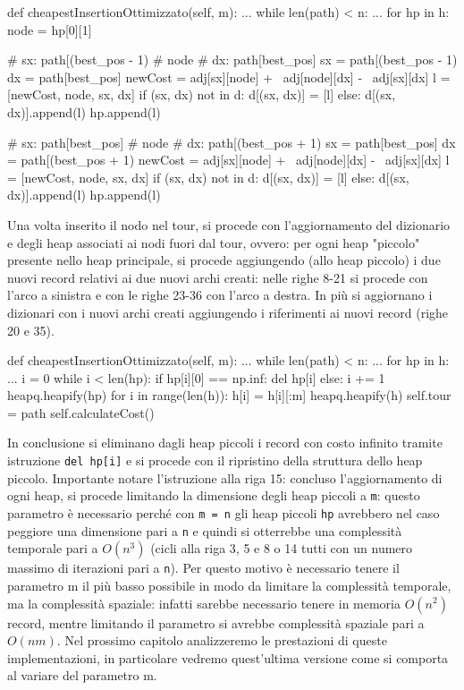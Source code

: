 \documentclass[a4paper,12pt]{report}
\begin{document}
\begin{python}
def cheapestInsertionOttimizzato(self, m):
  ...
  while len(path) < n:
    ...
    for hp in h:
      node = hp[0][1]

      # sx: path[(best_pos - 1) %
      # node
      # dx: path[best_pos]
      sx = path[(best_pos - 1) %
      dx = path[best_pos]
      newCost = adj[sx][node] + \
                adj[node][dx] - \
                adj[sx][dx]
      l = [newCost, node, sx, dx]
      if (sx, dx) not in d:
          d[(sx, dx)] = [l]
      else:
        d[(sx, dx)].append(l)
      hp.append(l)

      # sx: path[best_pos]
      # node
      # dx: path[(best_pos + 1) %
      sx = path[best_pos]
      dx = path[(best_pos + 1) %
      newCost = adj[sx][node] + \
                adj[node][dx] - \
                adj[sx][dx]
      l = [newCost, node, sx, dx]
      if (sx, dx) not in d:
        d[(sx, dx)] = [l]
      else:
        d[(sx, dx)].append(l)
      hp.append(l)
\end{python}
Una volta inserito il nodo nel tour, si procede con l'aggiornamento del dizionario e degli heap associati ai nodi fuori dal tour, ovvero: per ogni heap "piccolo" presente nello heap principale, si procede aggiungendo (allo heap piccolo) i due nuovi record relativi ai due nuovi archi creati: nelle righe 8-21 si procede con l'arco a sinistra e con le righe 23-36 con l'arco a destra. In più si aggiornano i dizionari con i nuovi archi creati aggiungendo i riferimenti ai nuovi record (righe 20 e 35).
\begin{python}
def cheapestInsertionOttimizzato(self, m):
  ...
  while len(path) < n:
    ...
    for hp in h:
      ...
      i = 0
      while i < len(hp):
        if hp[i][0] == np.inf:
          del hp[i]
        else:
          i += 1           
      heapq.heapify(hp)
    for i in range(len(h)):
      h[i] = h[i][:m]
    heapq.heapify(h)
  self.tour = path
  self.calculateCost()
\end{python}
In conclusione si eliminano dagli heap piccoli i record con costo infinito tramite istruzione \lstinline!del hp[i]! e si procede con il ripristino della struttura dello heap piccolo. \newline Importante notare l'istruzione alla riga 15: concluso l'aggiornamento di ogni heap, si procede limitando la dimensione degli heap piccoli a \lstinline!m!: questo parametro è necessario perché con \lstinline|m = n| gli heap piccoli \lstinline|hp| avrebbero nel caso peggiore una dimensione pari a \lstinline|n| e quindi si otterrebbe una complessità temporale pari a $O(n^3)$ (cicli alla riga 3, 5 e 8 o 14 tutti con un numero massimo di iterazioni pari a \lstinline|n|). Per questo motivo è necessario tenere il parametro m il più basso possibile in modo da limitare la complessità temporale, ma la complessità spaziale: infatti sarebbe necessario tenere in memoria $O(n^2)$ record, mentre limitando il parametro si avrebbe complessità spaziale pari a $O(nm)$. \newline
Nel prossimo capitolo analizzeremo le prestazioni di queste implementazioni, in particolare vedremo quest'ultima versione come si comporta al variare del parametro m.
\end{document}
